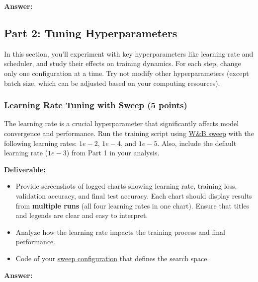 \documentclass[11pt, oneside]{article}   	%
\begin{document}
\begin{answerbox} \textbf{Answer:} \vspace*{1cm}





\end{answerbox}


\subsection*{Part 2: Tuning Hyperparameters}
In this section, you'll experiment with key hyperparameters like learning rate and scheduler, and study their effects on training dynamics. For each step, change only one configuration at a time. Try not modify other hyperparameters (except batch size, which can be adjusted based on your computing resources).

\subsubsection*{Learning Rate Tuning with Sweep (5 points)}
 The learning rate is a crucial hyperparameter that significantly affects model convergence and performance.  Run the training script using \href{https://docs.wandb.ai/guides/sweeps/walkthrough}{W\&B sweep} with the following learning rates: $1e-2$, $1e-4$, and $1e-5$. Also, include the default learning rate ($1e-3$) from Part 1 in your analysis.

\noindent\textbf{Deliverable:}
\begin{itemize}
    \item Provide screenshots of logged charts showing learning rate, training loss, validation accuracy, and final test accuracy. Each chart should display results from \textbf{multiple runs} (all four learning rates in one chart). Ensure that titles and legends are clear and easy to interpret.
    \item Analyze how the learning rate impacts the training process and final performance.
    \item Code of your \href{https://docs.wandb.ai/guides/sweeps/define-sweep-configuration}{sweep configuration} that defines the search space.
\end{itemize}

\begin{answerbox} \textbf{Answer:} \vspace*{1cm}

\end{answerbox}
\end{document}
